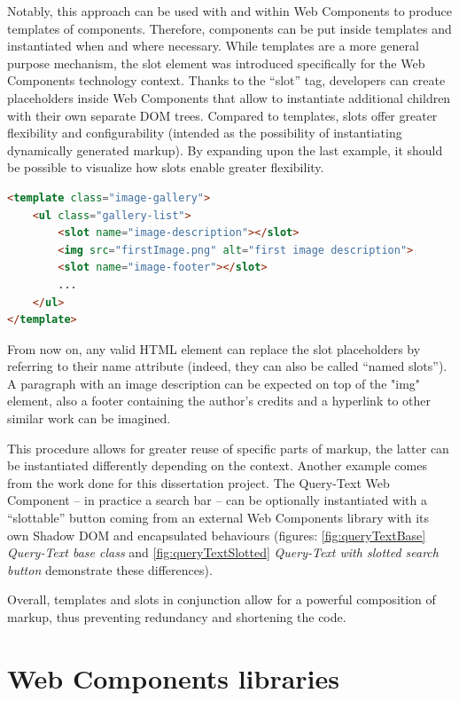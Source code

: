 Notably, this approach can be used with and within Web Components to produce templates of components. Therefore, components can be put inside templates and instantiated when and where necessary.
While templates are a more general purpose mechanism, the slot element was introduced specifically for the Web Components technology context.  Thanks to the “slot” tag, developers can create placeholders inside Web Components that allow to instantiate additional children with their own separate DOM trees. Compared to templates, slots offer greater flexibility and configurability (intended as the possibility of instantiating dynamically generated markup). By expanding upon the last example, it should be possible to visualize how slots enable greater flexibility.
\\
\begin{lstlisting}[caption={Slotted templates},label={slottedTemplate}, language=HTML]
<template class="image-gallery">
    <ul class="gallery-list">
        <slot name="image-description"></slot>
        <img src="firstImage.png" alt="first image description">
        <slot name="image-footer"></slot>
        ...
    </ul>
</template>
\end{lstlisting}

From now on, any valid HTML element can replace the slot placeholders by referring to their name attribute (indeed, they can also be called “named slots”). A paragraph with an image description can be expected on top of the "img" element, also a footer containing the author’s credits and a hyperlink to other similar work can be imagined.

This procedure allows for greater reuse of specific parts of markup, the latter can be instantiated differently depending on the context. Another example comes from the work done for this dissertation project. The Query-Text Web Component – in practice a search bar – can be optionally instantiated with a “slottable” button coming from an external Web Components library with its own Shadow DOM and encapsulated behaviours (figures: \ref{fig:queryTextBase} \emph{Query-Text base class} and \ref{fig:queryTextSlotted} \emph{Query-Text with slotted search button} demonstrate these differences).

Overall, templates and slots in conjunction allow for a powerful composition of markup, thus preventing redundancy and shortening the code. 

\section{Web Components libraries}
\label{sec:wCLibraries}

